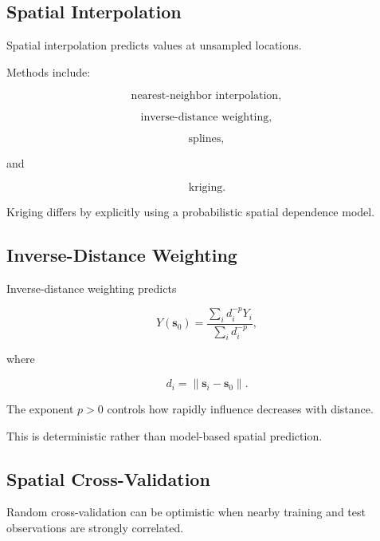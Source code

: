 \subsection{Spatial Interpolation}
\label{subsec:spatial-interpolation}

Spatial interpolation predicts values at unsampled locations.

Methods include:

\[
\boxed{
\text{nearest-neighbor interpolation},
}
\]

\[
\boxed{
\text{inverse-distance weighting},
}
\]

\[
\boxed{
\text{splines},
}
\]

and

\[
\boxed{
\text{kriging}.
}
\]

Kriging differs by explicitly using a probabilistic spatial dependence
model.

\subsection{Inverse-Distance Weighting}
\label{subsec:inverse-distance-weighting}

Inverse-distance weighting predicts

\[
\boxed{
\widehat{Y}
(
\mathbf{s}_0
)
=
\frac{
\displaystyle
\sum_i
d_i^{-p}Y_i
}{
\displaystyle
\sum_i
d_i^{-p}
},
}
\]

where

\[
d_i
=
\|
\mathbf{s}_i-\mathbf{s}_0
\|.
\]

The exponent \(p>0\) controls how rapidly influence decreases with
distance.

This is deterministic rather than model-based spatial prediction.

\subsection{Spatial Cross-Validation}
\label{subsec:spatial-cross-validation}

Random cross-validation can be optimistic when nearby training and test
observations are strongly correlated.

